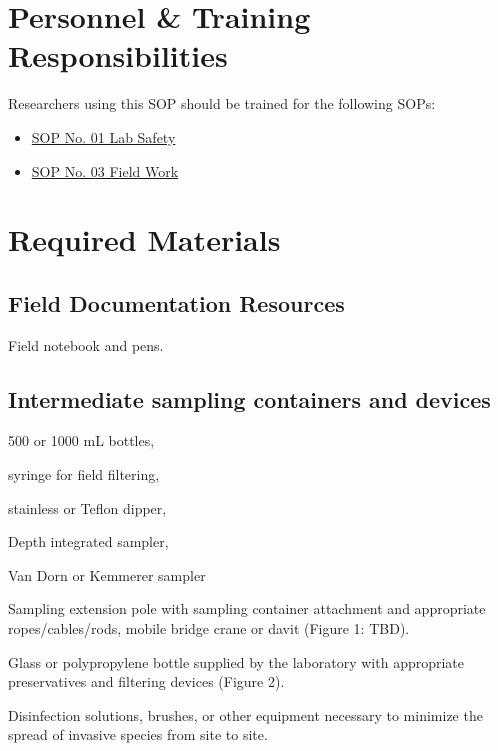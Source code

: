 \documentclass[12pt]{../SOP4_alpha}\usepackage[]{graphicx}\usepackage[]{xcolor}
\begin{document}
\section{Personnel \& Training Responsibilities}

Researchers using this SOP should be trained for the following SOPs:

\begin{itemize}
  \item \href{https://github.com/marclos/SOPs/blob/master/01_Laboratory_Safety/Laboratory_Safety_v1.04.pdf}{SOP No. 01 Lab Safety}
  \item \href{https://github.com/marclos/SOPs/blob/master/03_Field_Safety/Field_Safety_v1.1.pdf}{SOP No. 03 Field Work}
\end{itemize}

\section{Required Materials}

\subsection{Field Documentation Resources}

\NP Field notebook and pens.  

\subsection{Intermediate sampling containers and devices}

\begin{itemize*}

\item 500 or 1000 mL bottles, 
\item syringe for field filtering, 
\item stainless or Teflon dipper, 
\item Depth integrated sampler, 
\item Van Dorn or Kemmerer sampler
\item Sampling extension pole with sampling container attachment and appropriate ropes/cables/rods, mobile bridge crane or davit  (Figure 1: TBD).  
\item Glass or polypropylene bottle supplied by the laboratory with appropriate preservatives and filtering devices (Figure 2).  

\item Disinfection solutions, brushes, or other equipment necessary to minimize the spread of invasive species from site to site. %

\end{itemize*}
\end{document}
